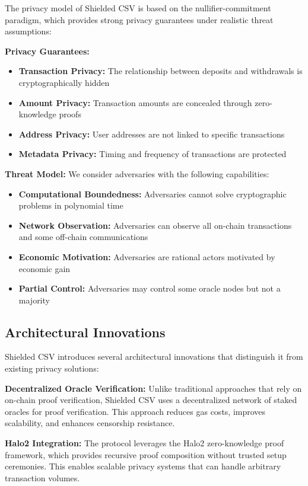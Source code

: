 \documentclass[11pt,a4paper]{article}
\begin{document}
The privacy model of Shielded CSV is based on the nullifier-commitment paradigm, which provides strong privacy guarantees under realistic threat assumptions:

\textbf{Privacy Guarantees:}
\begin{itemize}
    \item \textbf{Transaction Privacy:} The relationship between deposits and withdrawals is cryptographically hidden
    \item \textbf{Amount Privacy:} Transaction amounts are concealed through zero-knowledge proofs
    \item \textbf{Address Privacy:} User addresses are not linked to specific transactions
    \item \textbf{Metadata Privacy:} Timing and frequency of transactions are protected
\end{itemize}

\textbf{Threat Model:}
We consider adversaries with the following capabilities:
\begin{itemize}
    \item \textbf{Computational Boundedness:} Adversaries cannot solve cryptographic problems in polynomial time
    \item \textbf{Network Observation:} Adversaries can observe all on-chain transactions and some off-chain communications
    \item \textbf{Economic Motivation:} Adversaries are rational actors motivated by economic gain
    \item \textbf{Partial Control:} Adversaries may control some oracle nodes but not a majority
\end{itemize}

\subsection{Architectural Innovations}

Shielded CSV introduces several architectural innovations that distinguish it from existing privacy solutions:

\textbf{Decentralized Oracle Verification:} Unlike traditional approaches that rely on on-chain proof verification, Shielded CSV uses a decentralized network of staked oracles for proof verification. This approach reduces gas costs, improves scalability, and enhances censorship resistance.

\textbf{Halo2 Integration:} The protocol leverages the Halo2 zero-knowledge proof framework, which provides recursive proof composition without trusted setup ceremonies. This enables scalable privacy systems that can handle arbitrary transaction volumes.
\end{document}
